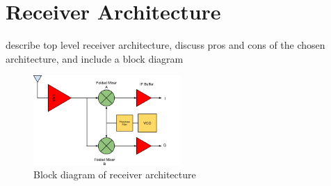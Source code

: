 \section{Receiver Architecture}
describe top level receiver architecture, discuss pros and cons of the chosen architecture, and include a block diagram

\begin{figure}[h]
   \centering
    \includegraphics[width=0.5\textwidth]{figures/receiver}
    \caption{
        Block diagram of receiver architecture
    }
    \label{fig:receiver}
\end{figure}